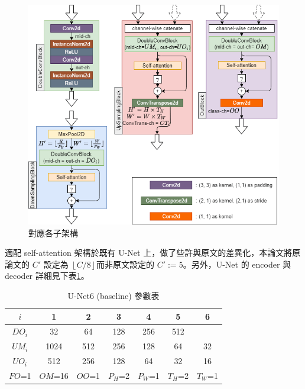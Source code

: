 \begin{figure}[htbp]
    \hfil
    \begin{minipage}[t]{0.55\textwidth}
        \includegraphics[width=\textwidth]{./figures/chapter04_experiment/Unet_sovia_sattn2.png}
        \caption {對應各子架構}
        \label{Unet_sovia_sattn2}
    \end{minipage}
    \hfil
\end{figure}

適配 self-attention 架構於既有 U-Net 上，做了些許與原文的差異化，本論文將原論文的 $C'$ 設定為 $\left \lfloor C/8 \right \rfloor$而非原文設定的 $C':=5$。另外，U-Net 的 encoder 與 decoder 詳細見下表\ref{UNet_sovia_setting}。

\begin{table}[htbp]
\centering
\begin{tabular}{ccccccc}
\multicolumn{1}{c|}{$i$} & 1 & 2 & 3 & 4 & 5 & 6 \\ \hline
\multicolumn{1}{c|}{$DO_i$} & 32 & 64 & 128 & 256 & 512 &  \\
\multicolumn{1}{c|}{$UM_i$} & 1024 & 512 & 256 & 128 & 64 & 32 \\
\multicolumn{1}{c|}{$UO_i$} & 512 & 256 & 128 & 64 & 32 & 16 \\ \hline
\multicolumn{1}{l}{$FO$=1} & \multicolumn{1}{l}{$OM$=16} & \multicolumn{1}{l}{$OO$=1} & \multicolumn{1}{l}{$P_H$=2} & \multicolumn{1}{l}{$P_W$=1} & \multicolumn{1}{l}{$T_H$=2} & \multicolumn{1}{l}{$T_W$=1}
\end{tabular}
\caption{U-Net6 (baseline) 參數表}
\label{UNet_sovia_setting}
\end{table}

